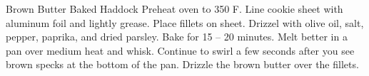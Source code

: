 \documentclass[../cookbook.tex]{subfiles}
\begin{document}
\begin{recipe}{Brown Butter Baked Haddock}{}{}
    Preheat oven to 350\degrees{} F. Line cookie sheet with aluminum foil and
    lightly grease. Place fillets on sheet.
    Drizzel with olive oil, salt, pepper, paprika, and dried parsley. Bake
    for 15 -- 20 minutes.
    Melt better in a pan over medium heat and whisk. Continue to swirl a few
    seconds after you see brown specks at the bottom of the pan. Drizzle the
    brown butter over the fillets.
\end{recipe}
\end{document}
